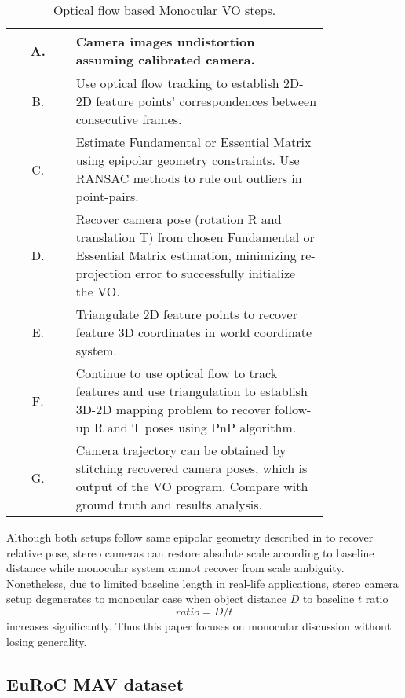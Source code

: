 \documentclass[10pt,twocolumn,letterpaper]{article}
\begin{document}
\begin{table}[t]
\begin{center}
\begin{tabular}{ |c|p{0.8\linewidth}| }
 \hline
 A. & Camera images undistortion assuming calibrated camera. \\ 
 \hline
 B. & Use optical flow tracking to establish 2D-2D feature points’ correspondences between consecutive frames. \\ 
 \hline
 C. & Estimate Fundamental or Essential Matrix using epipolar geometry constraints. Use RANSAC methods to rule out outliers in point-pairs.\\ 
 \hline
 D. & Recover camera pose (rotation R and translation T) from chosen Fundamental or Essential Matrix estimation, minimizing re-projection error to successfully initialize the VO. \\ 
 \hline
 E. & Triangulate 2D feature points to recover feature 3D coordinates in world coordinate system. \\ 
 \hline
 F. & Continue to use optical flow to track features and use triangulation to establish 3D-2D mapping problem to recover follow-up R and T poses using PnP algorithm. \\ 
 \hline
 G. & Camera trajectory can be obtained by stitching recovered camera poses, which is output of the VO program. Compare with ground truth and results analysis. \\
 \hline
\end{tabular}
\end{center}
\caption{Optical flow based Monocular VO steps.}
\label{table:1}
\end{table}

Although both setups follow same epipolar geometry described in \cite{Hartley2004} to recover relative pose, stereo cameras can restore absolute scale according to baseline distance while monocular system cannot recover from scale ambiguity. Nonetheless, due to limited baseline length in real-life applications, stereo camera setup degenerates to monocular case when object distance $D$ to baseline $t$ ratio 
\begin{equation} \label{eq:1}
ratio=D/t
\end{equation}
increases significantly. Thus this paper focuses on monocular discussion without losing generality. 

\subsection{EuRoC MAV dataset}
\end{document}
